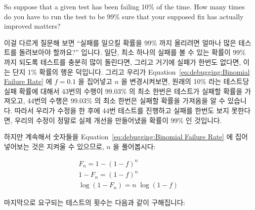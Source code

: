 So suppose that a given test has been failing 10\% of the time.
How many times do you have to run the test to be 99\% sure that
your supposed fix has actually improved matters?
\fi

이걸 다르게 질문해 보면 ``실패를 일으킬 확률을 99\% 까지 올리려면 얼마나 많은
테스트를 돌려보아야 할까요?'' 입니다.
일단, 최소 하나의 실패를 볼 수 있는 확률이 99\% 까지 되도록 테스트를 충분히
많이 돌린다면, 그리고 거기에 실패가 한번도 없다면, 이는 단지 1\% 확률의 행운
덕입니다.
그리고 우리가
Equation~\ref{eq:debugging:Binomial Failure Rate} 에 $f=0.1$ 을 집어넣고 $n$ 을
변경시켜보면, 원래의 10\% 라는 테스트당 실패 확률에 대해서 43번의 수행이
99.03\% 의 최소 한번은 테스트가 실패할 확률을 가져오고, 44번의 수행은 99.03\%
의 최소 한번은 실패할 확률을 가져옴을 알 수 있습니다.
따라서 우리가 수정을 한 후에 44번 테스트를 진행하고 실패를 한번도 보지
못한다면, 우리의 수정이 정말로 실제 개선을 만들어냈을 확률이 99\% 인 것입니다.

하지만 계속해서 숫자들을
Equation~\ref{eq:debugging:Binomial Failure Rate}
에 집어넣어보는 것은 지켜울 수 있으므로, $n$ 을 풀어봅시다:

\begin{eqnarray}
	F_n = 1-\left(1-f\right)^n \\
	1 - F_n = \left(1-f\right)^n \\
	\log \left(1 - F_n\right) = n \; \log \left(1 - f\right)
\end{eqnarray}

마지막으로 요구되는 테스트의 횟수는 다음과 같이 구해집니다:
\iffalse

